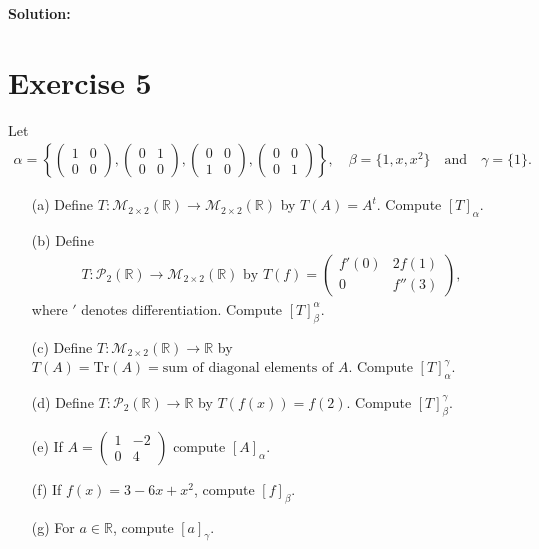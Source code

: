 \documentclass{article}
\begin{document}
\textbf{Solution: }\\



\newpage

\section*{Exercise 5}
Let
\begin{align*}
\alpha = \left\{\left(\begin{matrix} 1 & 0 \\ 0 & 0 \end{matrix}\right), \left(\begin{matrix} 0 & 1 \\ 0 & 0 \end{matrix}\right), \left(\begin{matrix} 0 & 0 \\ 1 & 0 \end{matrix}\right), \left(\begin{matrix} 0 & 0 \\ 0 & 1 \end{matrix}\right)\right\}, \quad \beta = \{1, x, x^2\} \quad \text{and} \quad \gamma = \{1\}.
\end{align*}

\begin{itemize}
    \item[(a)] Define $T : \mathcal{M}_{2\times2}(\mathbb{R}) \to \mathcal{M}_{2\times2}(\mathbb{R})$ by $T(A) = A^t$. Compute $[T]_{\alpha}$.

    \item[(b)] Define 
    \begin{align*}
    T : \mathcal{P}_2(\mathbb{R}) \to \mathcal{M}_{2\times2}(\mathbb{R}) \text{ by } T(f) = \left(\begin{matrix} f'(0) & 2f(1) \\ 0 & f''(3) \end{matrix}\right),
    \end{align*}
    where $'$ denotes differentiation. Compute $[T]_{\beta}^{\alpha}$.

    \item[(c)] Define $T : \mathcal{M}_{2\times2}(\mathbb{R}) \to \mathbb{R}$ by $T(A) = \text{Tr}(A) = \text{sum of diagonal elements of }A$. Compute $[T]_{\alpha}^{\gamma}$.

    \item[(d)] Define $T : \mathcal{P}_2(\mathbb{R}) \to \mathbb{R}$ by $T(f(x)) = f(2)$. Compute $[T]_{\beta}^{\gamma}$.

    \item[(e)] If $A = \left(\begin{matrix} 1 & -2 \\ 0 & 4 \end{matrix}\right)$ compute $[A]_{\alpha}$.

    \item[(f)] If $f(x) = 3 - 6x + x^2$, compute $[f]_{\beta}$.

    \item[(g)] For $a \in \mathbb{R}$, compute $[a]_{\gamma}$.
\end{itemize}
\end{document}
